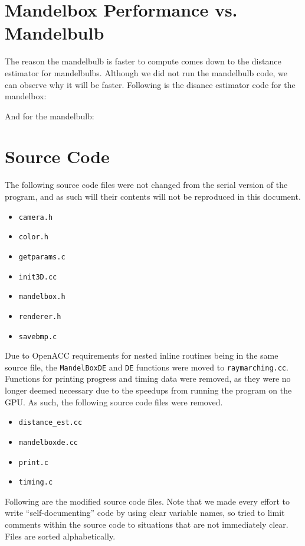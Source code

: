 \documentclass[11pt]{article}
\begin{document}
\section{Mandelbox Performance vs. Mandelbulb}
The reason the mandelbulb is faster to compute comes down to the distance estimator for mandelbulbs. Although we did not run the mandelbulb code, we can observe why it will be faster. Following is the disance estimator code for the mandelbox:


And for the mandelbulb:




\section{Source Code}
The following source code files were not changed from the serial version of the program, and as such will their contents will not be reproduced in this document.
\begin{itemize}
\item \texttt{camera.h}
\item \texttt{color.h}
\item \texttt{getparams.c}
\item \texttt{init3D.cc}
\item \texttt{mandelbox.h}
\item \texttt{renderer.h}
\item \texttt{savebmp.c}
\end{itemize}

Due to OpenACC requirements for nested inline routines being in the same source file, the \texttt{MandelBoxDE} and \texttt{DE} functions were moved to \texttt{raymarching.cc}. Functions for printing progress and timing data were removed, as they were no longer deemed necessary due to the speedups from running the program on the GPU. As such, the following source code files were removed.
\begin{itemize}
\item \texttt{distance\_est.cc}
\item \texttt{mandelboxde.cc}
\item \texttt{print.c}
\item \texttt{timing.c}
\end{itemize}

Following are the modified source code files. Note that we made every effort to write ``self-documenting'' code by using clear variable names, so tried to limit comments within the source code to situations that are not immediately clear. Files are sorted alphabetically.
\end{document}
